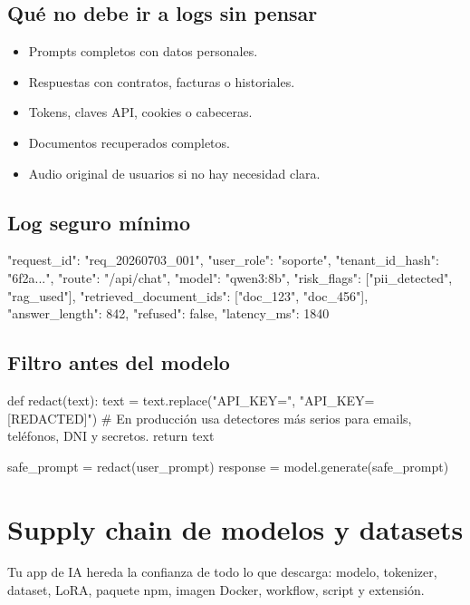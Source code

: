 \documentclass[11pt,a4paper]{book}
\begin{document}
\section{Qué no debe ir a logs sin pensar}
\begin{itemize}\item Prompts completos con datos personales.\end{itemize}
\begin{itemize}\item Respuestas con contratos, facturas o historiales.\end{itemize}
\begin{itemize}\item Tokens, claves API, cookies o cabeceras.\end{itemize}
\begin{itemize}\item Documentos recuperados completos.\end{itemize}
\begin{itemize}\item Audio original de usuarios si no hay necesidad clara.\end{itemize}
\section{Log seguro mínimo}
\begin{codebox}
{
  "request_id": "req_20260703_001",
  "user_role": "soporte",
  "tenant_id_hash": "6f2a...",
  "route": "/api/chat",
  "model": "qwen3:8b",
  "risk_flags": ["pii_detected", "rag_used"],
  "retrieved_document_ids": ["doc_123", "doc_456"],
  "answer_length": 842,
  "refused": false,
  "latency_ms": 1840
}
\end{codebox}
\section{Filtro antes del modelo}
\begin{codebox}
def redact(text):
    text = text.replace("API_KEY=", "API_KEY=[REDACTED]")
    # En producción usa detectores más serios para emails, teléfonos, DNI y secretos.
    return text

safe_prompt = redact(user_prompt)
response = model.generate(safe_prompt)
\end{codebox}
\chapter{Supply chain de modelos y datasets}
Tu app de IA hereda la confianza de todo lo que descarga: modelo, tokenizer, dataset, LoRA, paquete npm, imagen Docker, workflow, script y extensión.
\end{document}
